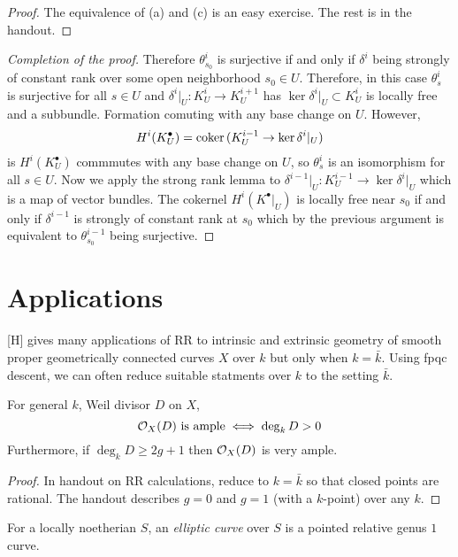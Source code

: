 \documentclass[12pt]{article}
\begin{document}
\begin{proof}
The equivalence of (a) and (c) is an easy exercise. The rest is in the handout.
\end{proof}

\begin{proof}[Completion of the proof]
Therefore $\theta^i_{s_0}$ is surjective if and only if $\delta^i$ being strongly of constant rank over some open neighborhood $s_0 \in U$. Therefore, in this case $\theta^i_s$ is surjective for all $s \in U$ and $\delta^i|_U : K^i_U \to K^{i+1}_U$ has $\ker{\delta^i|_U} \subset K^i_U$ is locally free and a subbundle. Formation comuting with any base change on $U$. However,
\[ H^i(K^\bullet_U) = \operatorname{\mathrm{coker}}{(K^{i-1}_U \to \ker{\delta^i|_U})} \]
is $H^i(K^\bullet_U)$ commmutes with any base change on $U$, so $\theta^i_s$ is an isomorphism for all $s \in U$. Now we apply the strong rank lemma to $\delta^{i-1}|_U : K^{i-1}_U \to \ker{\delta^i|_U}$ which is a map of vector bundles. The cokernel $H^i(K^\bullet|_U)$ is locally free near $s_0$ if and only if $\delta^{i-1}$ is strongly of constant rank at $s_0$ which by the previous argument is equivalent to $\theta^{i-1}_{s_0}$ being surjective.
\end{proof}

\section{Applications}

[H] gives many applications of RR to intrinsic and extrinsic geometry of smooth proper geometrically connected curves $X$ over $k$ but only when $k = \bar{k}$. Using fpqc descent, we can often reduce suitable statments over $k$ to the setting $\bar{k}$. 

\begin{theorem}
For general $k$, Weil divisor $D$ on $X$,
\[ \mathcal{O}_{X}(D) \text{ is ample} \iff \deg_k D > 0 \]
Furthermore, if $\deg_k D \ge 2 g + 1$ then $\mathcal{O}_{X}(D)$ is very ample.
\end{theorem}

\begin{proof}
In handout on RR calculations, reduce to $k = \bar{k}$ so that closed points are rational. The handout describes $g = 0$ and $g = 1$ (with a $k$-point) over any $k$. 
\end{proof}

\begin{defn}
For a locally noetherian $S$, an \textit{elliptic curve} over $S$ is a pointed relative genus $1$ curve. 
\end{defn}
\end{document}
